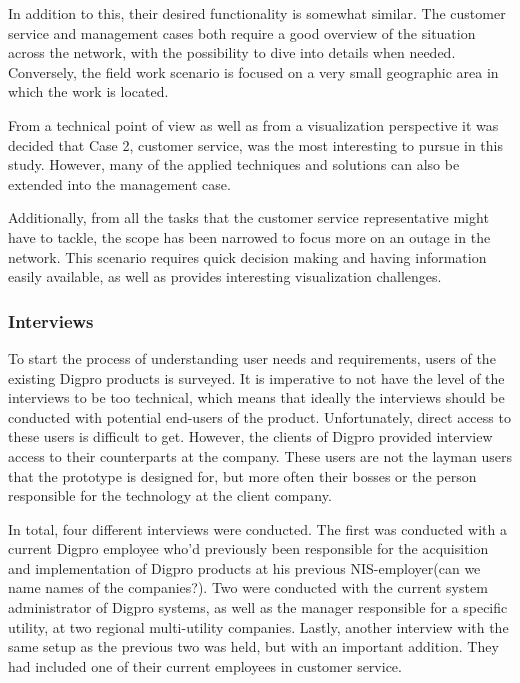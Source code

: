 \documentclass[a4paper,12pt,titlepage]{article}
\begin{document}
In addition to this, their desired functionality is somewhat similar. The customer service and management cases both require a good overview of the situation across the network, with the possibility to dive into details when needed. Conversely, the field work scenario is focused on a very small geographic area in which the work is located. 

From a technical point of view as well as from a visualization perspective it was decided that Case 2, customer service, was the most interesting to pursue in this study. However, many of the applied techniques and solutions can also be extended into the management case.

Additionally, from all the tasks that the customer service representative might have to tackle, the scope has been narrowed to focus more on an outage in the network. This scenario requires quick decision making and having information easily available, as well as provides interesting visualization challenges.

\subsubsection{Interviews}

To start the process of understanding user needs and requirements, users of the existing Digpro products is surveyed. It is imperative to not have the level of the interviews to be too technical, which means that ideally the interviews should be conducted with potential end-users of the product. Unfortunately, direct access to these users is difficult to get. However, the clients of Digpro provided interview access to their counterparts at the company. These users are not the layman users that the prototype is designed for, but more often their bosses or the person responsible for the technology at the client company.

In total, four different interviews were conducted. The first was conducted with a current Digpro employee who'd previously been responsible for the acquisition and implementation of Digpro products at his previous NIS-employer(can we name names of the companies?). Two were conducted with the current system administrator of Digpro systems, as well as the manager responsible for a specific utility, at two regional multi-utility companies. Lastly, another interview with the same setup as the previous two was held, but with an important addition. They had included one of their current employees in customer service.
\end{document}
